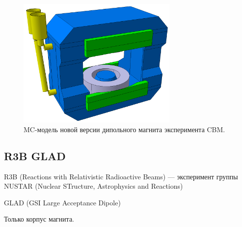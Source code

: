 \begin{figure}[H]
\centering
\includegraphics[width=0.7\textwidth]{pictures/New_CBM_magnet.png}
\caption{MC-модель новой версии дипольного магнита эксперимента CBM.}
\label{fig:NewCbmMagnet1}
\end{figure}

\subsection{R3B GLAD}\label{sec:secGlad}

R3B (Reactions with Relativistic Radioactive Beams) --- эксперимент группы NUSTAR (Nuclear STructure, Astrophysics and Reactions)

GLAD (GSI Large Acceptance Dipole)

Только корпус магнита.

